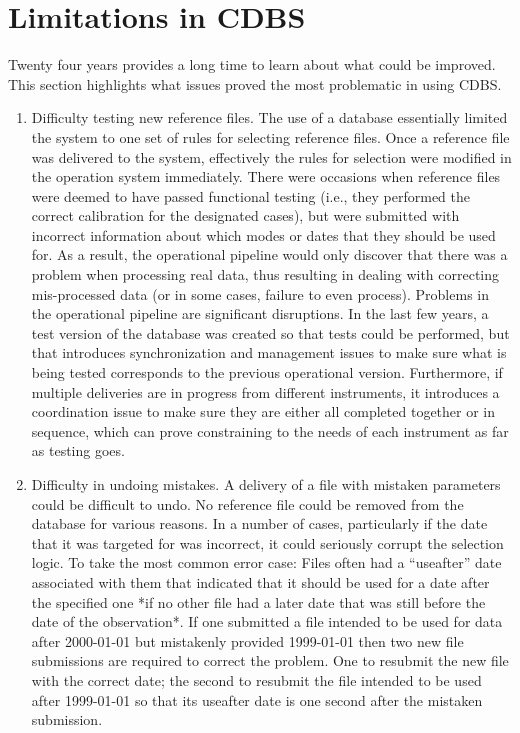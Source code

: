 \documentclass[final,authoryear,5p,times,twocolumn]{elsarticle}
\begin{document}
\section{Limitations in CDBS}

Twenty four years provides a long time to learn about what could be
improved. This section highlights what issues proved the most problematic in
using CDBS.

\begin{enumerate}
\item Difficulty testing new reference files. The use of a database essentially
limited the system to one set of rules for selecting reference files. Once a
reference file was delivered to the system, effectively the rules for selection
were modified in the operation system immediately. There were occasions when
reference files were deemed to have passed functional testing (i.e., they
performed the correct calibration for the designated cases), but were submitted
with incorrect information about which modes or dates that they should be used
for. As a result, the operational pipeline would only discover that there was a
problem when processing real data, thus resulting in dealing with correcting
mis-processed data (or in some cases, failure to even process). Problems in the
operational pipeline are significant disruptions. In the last few years, a test
version of the database was created so that tests could be performed, but that
introduces synchronization and management issues to make sure what is being
tested corresponds to the previous operational version. Furthermore, if
multiple deliveries are in progress from different instruments, it introduces a
coordination issue to make sure they are either all completed together or in
sequence, which can prove constraining to the needs of each instrument as far
as testing goes.

\item Difficulty in undoing mistakes. A delivery of a file with mistaken
parameters could be difficult to undo. No reference file could be removed from
the database for various reasons. In a number of cases, particularly if the
date that it was targeted for was incorrect, it could seriously corrupt the
selection logic. To take the most common error case: Files often had a
``useafter'' date associated with them that indicated that it should be used for
a date after the specified one *if no other file had a later date that was
still before the date of the observation*. If one submitted a file intended to
be used for data after 2000-01-01 but mistakenly provided
1999-01-01 then two new file submissions are required to correct the problem.
One to resubmit the new file with the correct date; the second to resubmit the file
intended to be used after 1999-01-01 so that its useafter date is one second after
the mistaken submission. 


\end{enumerate}
\end{document}

